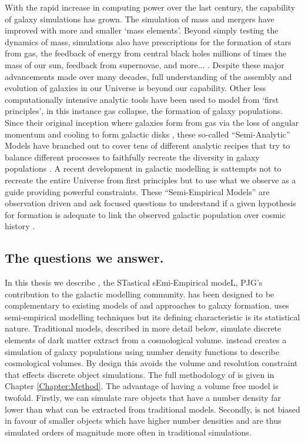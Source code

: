With the rapid increase in computing power over the last century, the capability of galaxy simulations has grown. The simulation of mass and mergers have improved with more and smaller `mass elements'. Beyond simply testing the dynamics of mass, simulations also have prescriptions for the formation of stars from gas, the feedback of energy from central black holes millions of times the mass of our sun, feedback from supernovae, and more... \citep[e.g.,][]{McAlpine2015TheCatalogues, Pillepich2018FirstGalaxies}. Despite these major advancements made over many decades, full understanding of the assembly and evolution of galaxies in our Universe is beyond our capability. Other less computationally intensive analytic tools have been used to model from `first principles', in this instance gas collapse, the formation of galaxy populations. Since their original inception where galaxies form from gas via the loss of angular momentum and cooling to form galactic disks \cite{Mo1998TheDiscs}, these so-called ``Semi-Analytic'' Models have branched out to cover tens of different analytic recipes that try to balance different processes to faithfully recreate the diversity in galaxy populations \citep[e.g.,][]{DeLucia2006TheGalaxies, Guo2011FromCosmology}. A recent development in galactic modelling is sattempts not to recreate the entire Universe from first principles but to use what we observe as a guide providing powerful constraints. These ``Semi-Empirical Models'' are observation driven and ask focused questions to understand if a given hypothesis for formation is adequate to link the observed galactic population over cosmic history \citep{Hopkins2010MERGERSMATTER, Zavala2012, Moster2013, Shankar2014, Moster2018Emerge10}.

\subsection{The questions we answer.}
In this thesis we describe \steel, the STastical sEmi-Empirical modeL, PJG's contribution to the galactic modelling community. \steel has been designed to be complementary to existing models of and approaches to galaxy formation. \steel uses semi-empirical modelling techniques but its defining characteristic is its statistical nature. Traditional models, described in more detail below, simulate discrete elements of dark matter extract from a cosmological volume. \steel instead creates a simulation of galaxy populations using number density functions to describe cosmological volumes. By design this avoids the volume and resolution constraint that effects discrete object simulations. The full methodology of \steel is given in Chapter \ref{Chapter:Method}. The advantage of having a volume free model is twofold. Firstly, we can simulate rare objects that have a number density far lower than what can be extracted from traditional models. Secondly, \steel is not biased in favour of smaller objects which have higher number densities and are thus simulated orders of magnitude more often in traditional simulations.

